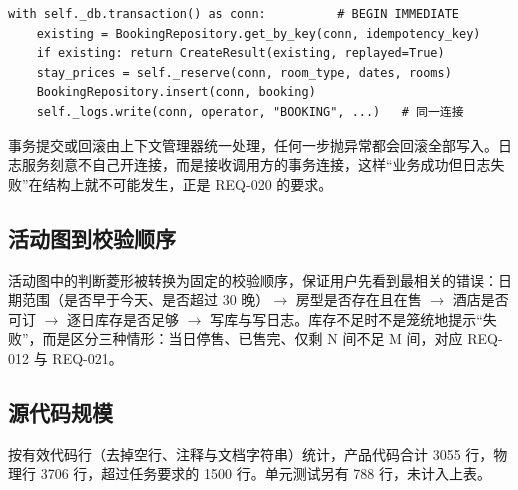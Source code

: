 \documentclass[11pt,a4paper,fontset=none]{ctexart}
\begin{document}
\begin{lstlisting}
with self._db.transaction() as conn:          # BEGIN IMMEDIATE
    existing = BookingRepository.get_by_key(conn, idempotency_key)
    if existing: return CreateResult(existing, replayed=True)
    stay_prices = self._reserve(conn, room_type, dates, rooms)
    BookingRepository.insert(conn, booking)
    self._logs.write(conn, operator, "BOOKING", ...)   # 同一连接
\end{lstlisting}

事务提交或回滚由上下文管理器统一处理，任何一步抛异常都会回滚全部写入。日志服务刻意不自己开连接，而是接收调用方的事务连接，这样“业务成功但日志失败”在结构上就不可能发生，正是 REQ-020 的要求。

\subsection{活动图到校验顺序}

活动图中的判断菱形被转换为固定的校验顺序，保证用户先看到最相关的错误：日期范围（是否早于今天、是否超过 30 晚）$\rightarrow$ 房型是否存在且在售 $\rightarrow$ 酒店是否可订 $\rightarrow$ 逐日库存是否足够 $\rightarrow$ 写库与写日志。库存不足时不是笼统地提示“失败”，而是区分三种情形：当日停售、已售完、仅剩 N 间不足 M 间，对应 REQ-012 与 REQ-021。

\subsection{源代码规模}

按有效代码行（去掉空行、注释与文档字符串）统计，产品代码合计 3055 行，物理行 3706 行，超过任务要求的 1500 行。单元测试另有 788 行，未计入上表。
\end{document}
